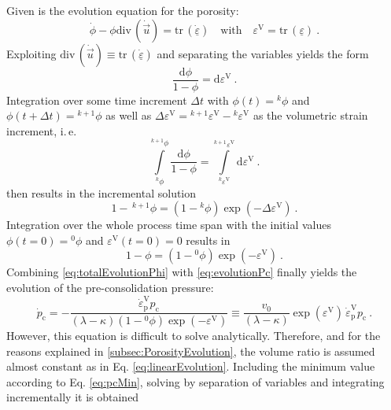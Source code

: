 \documentclass[paper=a4, twoside, pagesize]{scrartcl}
\newcommand{\tensor}[1]{\underline{#1}}
\renewcommand{\c}{\text{c}}
\renewcommand{\d}{\text{d}}
\newcommand{\p}{\text{p}}
\newcommand{\with}{\text{with}}
\newcommand{\trace}{\mathrm{tr}\,}
\newcommand{\divergence}{\mathrm{div}\,}
\newcommand{\minus}{-}
\begin{document}
Given is the evolution equation for the porosity:
\begin{equation}
  \dot{\phi} - \phi\divergence(\dot{\vec u}) = \trace(\dot{\tensor\varepsilon}) \quad\with\quad \varepsilon^\text{V} = \trace({\tensor\varepsilon}) \ .
\end{equation}
Exploiting $\divergence(\dot{\vec u})\equiv \trace(\dot{\tensor\varepsilon})$ and separating the variables yields the form
\begin{equation}
  \frac{\d\phi}{1-\phi} = \d\varepsilon^\text{V} \ .
\end{equation}
Integration over some time increment $\varDelta t$ with $\phi(t)={}^{k\!}\phi$ and $\phi(t+\varDelta t)={}^{k+1\!}\phi$ as well as $\Delta\varepsilon^\text{V}={}^{k+1\!}\varepsilon^\text{V}-{}^{k\!}\varepsilon^\text{V}$ as the volumetric strain increment, i.\,e.
\begin{equation}
  \int\limits_{{}^{k\!}\phi}^{{}^{k+1\!}\phi} \frac{\d\phi}{1-\phi} = \int\limits_{{}^{k\!}\varepsilon^\text{V}}^{{}^{k+1\!}\varepsilon^\text{V}} \d\varepsilon^\text{V} \ .
\end{equation}
then results in the incremental solution
\begin{equation}\label{eq:evolutionPhi}
  1 -\, {}^{k+1}\!\phi = (1-{}^{k}\!\phi) \exp(\minus\Delta\varepsilon^\text{V}) \ .
\end{equation}
Integration over the whole process time span with the initial values $\phi(t=0)={}^{0\!}\phi$ and $\varepsilon^\text{V}(t=0)=0$ results in
\begin{equation}\label{eq:totalEvolutionPhi}
  1-\phi = (1-{}^{0}\!\phi) \exp(\minus\varepsilon^\text{V}) \ .
\end{equation}
Combining \eqref{eq:totalEvolutionPhi} with \eqref{eq:evolutionPc} finally yields the evolution of the pre-consolidation pressure:
\begin{equation}
  \dot{p}_\c 
  = -\frac{\dot{\varepsilon}_\p^\text{V} p_\c}{(\lambda - \kappa)(1-{}^{0}\!\phi) \exp(\minus\varepsilon^\text{V})}
  \equiv \frac{v_0}{(\lambda - \kappa)} \exp(\varepsilon^\text{V})\, \dot{\varepsilon}_\p^\text{V} p_\c  \ .
\end{equation}
However, this equation is difficult to solve analytically. Therefore, and for the reasons explained in \autoref{subsec:PorosityEvolution}, the volume ratio is assumed almost constant as in Eq. \eqref{eq:linearEvolution}. Including the minimum value according to Eq. \eqref{eq:pcMin}, solving by separation of variables and integrating incrementally it is obtained
\end{document}
